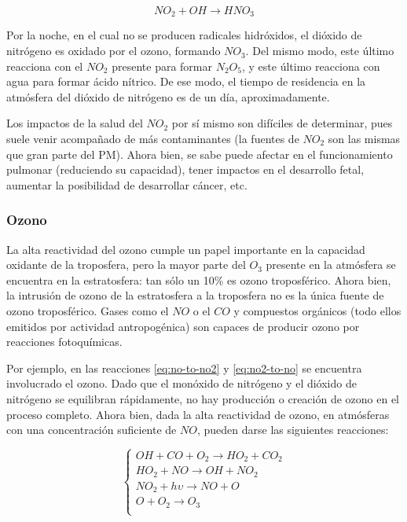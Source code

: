 \documentclass[12pt]{article}
\begin{document}
\begin{equation}
NO_{2} + OH \rightarrow HNO_{3}
\label{eq:no2-to-hno3}
\end{equation}

Por la noche, en el cual no se producen radicales hidróxidos, el dióxido de nitrógeno es oxidado por el ozono, formando $NO_{3}$. Del mismo modo, este último reacciona con el $NO_{2}$ presente para formar $N_{2}O_{5}$, y este último reacciona con agua para formar ácido nítrico. De ese modo, el tiempo de residencia en la atmósfera del dióxido de nitrógeno es de un día, aproximadamente.

Los impactos de la salud del $NO_{2}$ por sí mismo son difíciles de determinar, pues suele venir acompañado de más contaminantes (la fuentes de $NO_{2}$ son las mismas que gran parte del PM). Ahora bien, se sabe puede afectar en el funcionamiento pulmonar (reduciendo su capacidad), tener impactos en el desarrollo fetal, aumentar la posibilidad de desarrollar cáncer, etc.

\subsubsection{Ozono}

La alta reactividad del ozono cumple un papel importante en la capacidad oxidante de la troposfera, pero la mayor parte del $O_{3}$ presente en la atmósfera se encuentra en la estratosfera: tan sólo un 10\% es ozono troposférico.  Ahora bien, la intrusión de ozono de la estratosfera a la troposfera no es la única fuente de ozono troposférico. Gases como el $NO$ o el $CO$ y compuestos orgánicos (todo ellos emitidos por actividad antropogénica) son capaces de producir ozono por reacciones fotoquímicas.

Por ejemplo, en las reacciones \ref{eq:no-to-no2} y \ref{eq:no2-to-no} se encuentra involucrado el ozono. Dado que el monóxido de nitrógeno y el dióxido de nitrógeno se equilibran rápidamente, no hay producción o creación de ozono en el proceso completo. Ahora bien, dada la alta reactividad de ozono, en atmósferas con una concentración suficiente de $NO$, pueden darse las siguientes reacciones:

\begin{equation}
\begin{cases}
OH + CO + O_{2} \rightarrow HO_{2} + CO_{2} \\
HO_{2} + NO \rightarrow OH + NO_{2} \\
NO_{2} + h\upsilon \rightarrow NO + O \\
O + O_{2} \rightarrow O_{3} \\
\end{cases}
\end{equation}
\end{document}
